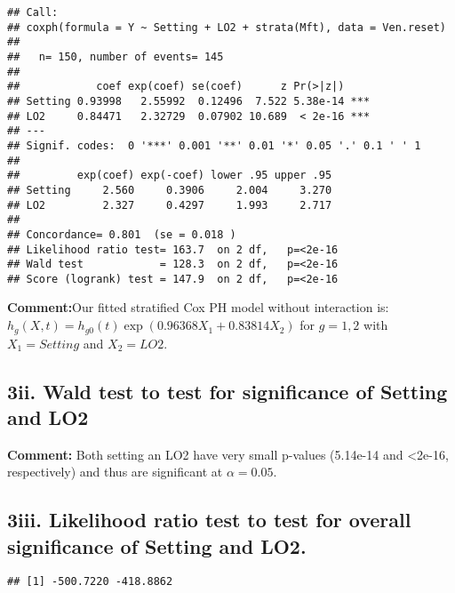 \documentclass[
]{article}
\newenvironment{Shaded}{\begin{snugshade}}{\end{snugshade}}
\newcommand{\NormalTok}[1]{#1}
\newcommand{\SpecialCharTok}[1]{\textcolor[rgb]{0.00,0.00,0.00}{#1}}
\begin{document}
\begin{verbatim}
## Call:
## coxph(formula = Y ~ Setting + LO2 + strata(Mft), data = Ven.reset)
## 
##   n= 150, number of events= 145 
## 
##            coef exp(coef) se(coef)      z Pr(>|z|)    
## Setting 0.93998   2.55992  0.12496  7.522 5.38e-14 ***
## LO2     0.84471   2.32729  0.07902 10.689  < 2e-16 ***
## ---
## Signif. codes:  0 '***' 0.001 '**' 0.01 '*' 0.05 '.' 0.1 ' ' 1
## 
##         exp(coef) exp(-coef) lower .95 upper .95
## Setting     2.560     0.3906     2.004     3.270
## LO2         2.327     0.4297     1.993     2.717
## 
## Concordance= 0.801  (se = 0.018 )
## Likelihood ratio test= 163.7  on 2 df,   p=<2e-16
## Wald test            = 128.3  on 2 df,   p=<2e-16
## Score (logrank) test = 147.9  on 2 df,   p=<2e-16
\end{verbatim}

\textbf{Comment:}Our fitted stratified Cox PH model without interaction
is: \(h_g(X,t)=h_{g0}(t)\exp(0.96368X_1+0.83814X_2)\) for \(g=1,2\) with
\(X_1=Setting\) and \(X_2=LO2\).

\hypertarget{ii.-wald-test-to-test-for-significance-of-setting-and-lo2}{%
\subsection{3ii. Wald test to test for significance of Setting and
LO2}\label{ii.-wald-test-to-test-for-significance-of-setting-and-lo2}}

\textbf{Comment:} Both setting an LO2 have very small p-values (5.14e-14
and \textless2e-16, respectively) and thus are significant at
\(\alpha=0.05\).

\hypertarget{iii.-likelihood-ratio-test-to-test-for-overall-significance-of-setting-and-lo2.}{%
\subsection{3iii. Likelihood ratio test to test for overall significance
of Setting and
LO2.}\label{iii.-likelihood-ratio-test-to-test-for-overall-significance-of-setting-and-lo2.}}

\begin{Shaded}
\end{Shaded}

\begin{verbatim}
## [1] -500.7220 -418.8862
\end{verbatim}
\end{document}
